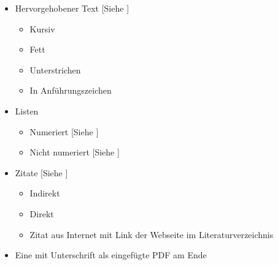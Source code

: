 \begin{itemize}
    \item Hervorgehobener Text      [Siehe ]
        \begin{itemize}
            \item Kursiv
            \item Fett
            \item Unterstrichen
            \item In Anführungszeichen
        \end{itemize}
    \item Listen                
        \begin{itemize}
            \item Numeriert             [Siehe ]
            \item Nicht numeriert       [Siehe ]
        \end{itemize}
    \item Zitate                   [Siehe ]
        \begin{itemize}
            \item Indirekt
            \item Direkt 
            \item Zitat aus Internet mit Link der Webseite im Literaturverzeichnis
        \end{itemize}
    \item Eine  mit Unterschrift als eingefügte PDF am Ende
\end{itemize}